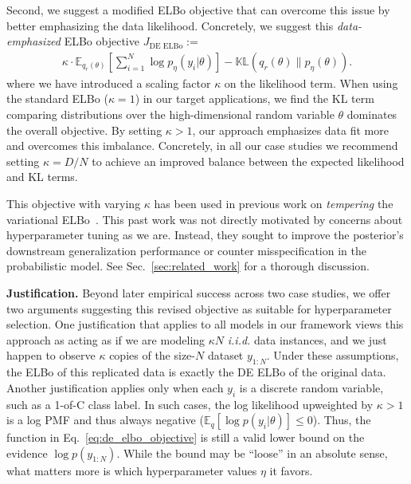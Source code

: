 Second, we suggest a modified ELBo objective that can overcome this issue by better emphasizing the data likelihood. Concretely, we suggest this \emph{data-emphasized} ELBo objective $J_{\text{DE ELBo}} :=$
\begin{align}
    \label{eq:de_elbo_objective}
    \kappa \cdot \mathbb{E}_{q_r(\theta)} \left[ \sum_{i=1}^{N} \log p_{\eta}(y_i | \theta) \right] 
    - \mathbb{KL}(q_r(\theta) \| p_{\eta}(\theta) ).
\end{align}
where we have introduced a scaling factor $\kappa$ on the likelihood term. 
When using the standard ELBo ($\kappa = 1$) in our target applications, we find the KL term comparing distributions over the high-dimensional random variable $\theta$ dominates the overall objective. By setting $\kappa > 1$, our approach emphasizes data fit more and overcomes this imbalance.
Concretely, in all our case studies we recommend setting $\kappa = D/N$ to achieve an improved balance between the expected likelihood and KL terms.

This objective with varying $\kappa$ has been used in previous work on \emph{tempering} the variational ELBo~\citep{mandt2016variational,aitchison2021statistical,pitas2024fine}. This past work was not directly motivated by concerns about hyperparameter tuning as we are. Instead, they sought to improve the posterior's downstream generalization performance or counter misspecification in the probabilistic model. See Sec.~\ref{sec:related_work} for a thorough discussion.

\textbf{Justification.} Beyond later empirical success across two case studies, we offer two arguments suggesting this revised objective as suitable for hyperparameter selection.
One justification that applies to all models in our framework views this approach as acting as if we are modeling $\kappa N$ \emph{i.i.d.} data instances, and we just happen to observe $\kappa$ copies of the size-$N$ dataset $y_{1:N}$. Under these assumptions, the ELBo of this replicated data is exactly the DE ELBo of the original data. Another justification applies only when each $y_i$ is a discrete random variable, such as a 1-of-C class label. In such cases, the log likelihood upweighted by $\kappa > 1$ is a log PMF and thus always negative ($\mathbb{E}_{q}[\log p( y_i | \theta)] \leq 0$).
Thus, the function in Eq.~\eqref{eq:de_elbo_objective} is still a valid lower bound on the evidence $\log p( y_{1:N} )$. While the bound may be ``loose'' in an absolute sense, what matters more is which hyperparameter values $\eta$ it favors.

